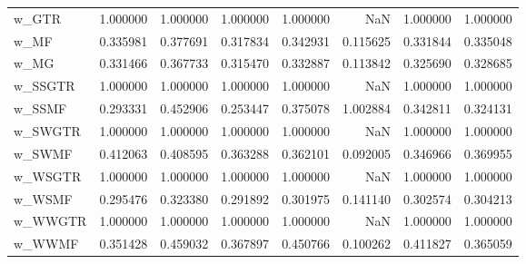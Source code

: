 \begin{tabular}{lrrrrrrr}
w\_GTR             &    1.000000 &     1.000000 &         1.000000 &     1.000000 &         NaN &     1.000000 &     1.000000 \\
w\_MF              &    0.335981 &     0.377691 &         0.317834 &     0.342931 &    0.115625 &     0.331844 &     0.335048 \\
w\_MG              &    0.331466 &     0.367733 &         0.315470 &     0.332887 &    0.113842 &     0.325690 &     0.328685 \\
w\_SSGTR           &    1.000000 &     1.000000 &         1.000000 &     1.000000 &         NaN &     1.000000 &     1.000000 \\
w\_SSMF            &    0.293331 &     0.452906 &         0.253447 &     0.375078 &    1.002884 &     0.342811 &     0.324131 \\
w\_SWGTR           &    1.000000 &     1.000000 &         1.000000 &     1.000000 &         NaN &     1.000000 &     1.000000 \\
w\_SWMF            &    0.412063 &     0.408595 &         0.363288 &     0.362101 &    0.092005 &     0.346966 &     0.369955 \\
w\_WSGTR           &    1.000000 &     1.000000 &         1.000000 &     1.000000 &         NaN &     1.000000 &     1.000000 \\
w\_WSMF            &    0.295476 &     0.323380 &         0.291892 &     0.301975 &    0.141140 &     0.302574 &     0.304213 \\
w\_WWGTR           &    1.000000 &     1.000000 &         1.000000 &     1.000000 &         NaN &     1.000000 &     1.000000 \\
w\_WWMF            &    0.351428 &     0.459032 &         0.367897 &     0.450766 &    0.100262 &     0.411827 &     0.365059 \\
\bottomrule
\end{tabular}
